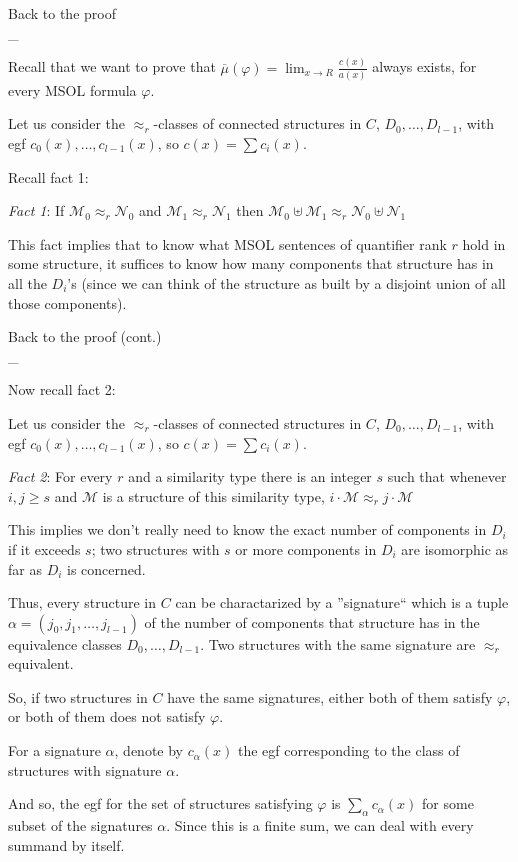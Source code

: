 \documentclass[landscape,a4]{myslides}
\begin{document}
\begin{slide}
\begin{center}
{%
\color{blue}
Back to the proof
}
\\
\_\hrulefill
\end{center}
\small

Recall that we want to prove that $\overline{\mu}(\varphi) = \lim_{x\to R}\frac{c(x)}{a(x)}$ always exists, for every MSOL formula $\varphi$.

Let us consider the $\approx_{r}$-classes of connected structures in $C$, $D_0,\dots,D_{l-1}$, with egf $c_0(x),\dots,c_{l-1}(x)$, so $c(x) = \sum c_i(x)$.

Recall fact 1:

\emph{Fact 1}: If $\mathcal{M}_0\approx_r\mathcal{N}_0$ and $\mathcal{M}_1\approx_r\mathcal{N}_1$ then $\mathcal{M}_0\uplus\mathcal{M}_1\approx_r\mathcal{N}_0\uplus\mathcal{N}_1$

This fact implies that to know what MSOL sentences  of quantifier rank $r$ hold in some structure, it suffices to know how many components that structure has in all the $D_i$'s 
(since we can think of the structure as built by a disjoint union of all those components).
\end{slide}

\begin{slide}
\begin{center}
{%
\color{blue}
Back to the proof (cont.)
}
\\
\_\hrulefill
\end{center}
\small

Now recall fact 2:

Let us consider the $\approx_{r}$-classes of connected structures in $C$, $D_0,\dots,D_{l-1}$, with egf $c_0(x),\dots,c_{l-1}(x)$, so $c(x) = \sum c_i(x)$.

\emph{Fact 2}: For every $r$ and a similarity type there is an integer $s$ such that whenever $i,j\ge s$ and $\mathcal{M}$ is a structure of this similarity type, $i\cdot\mathcal{M}\approx_rj\cdot\mathcal{M}$

This implies we don't really need to know the exact number of components in $D_i$ if it exceeds $s$; two structures with $s$ or more components in $D_i$ are isomorphic as far as $D_i$ is concerned.

Thus, every structure in $C$ can be charactarized by a ''signature`` which is a tuple $\alpha = (j_0,j_1,\dots,j_{l-1})$ of the number of components that structure has in the equivalence classes $D_0,\dots,D_{l-1}$. Two structures with the same signature are $\approx_{r}$ equivalent.

So, if two structures in $C$ have the same signatures, either both of them satisfy $\varphi$, or both of them does not satisfy $\varphi$. 

For a signature $\alpha$, denote by $c_\alpha(x)$ the egf corresponding to the class of structures with signature $\alpha$.

And so, the egf for the set of structures satisfying $\varphi$ is $\sum_\alpha c_\alpha(x)$ for some subset of the signatures $\alpha$. Since this is a finite sum, we can deal with every summand by itself.

\end{slide}
\end{document}
